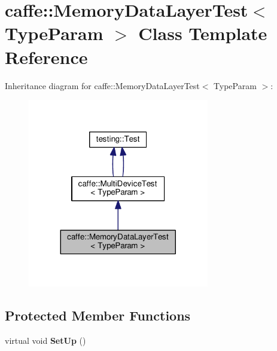 \hypertarget{classcaffe_1_1_memory_data_layer_test}{}\section{caffe\+:\+:Memory\+Data\+Layer\+Test$<$ Type\+Param $>$ Class Template Reference}
\label{classcaffe_1_1_memory_data_layer_test}


Inheritance diagram for caffe\+:\+:Memory\+Data\+Layer\+Test$<$ Type\+Param $>$\+:
\nopagebreak
\begin{figure}[H]
\begin{center}
\leavevmode
\includegraphics[width=224pt]{classcaffe_1_1_memory_data_layer_test__inherit__graph}
\end{center}
\end{figure}
\subsection*{Protected Member Functions}
\begin{DoxyCompactItemize}
\item 
\mbox{\label{classcaffe_1_1_memory_data_layer_test_ab3565f26f6c2f0148cf1817c2430094f}} 
virtual void {\bfseries Set\+Up} ()
\end{DoxyCompactItemize}
